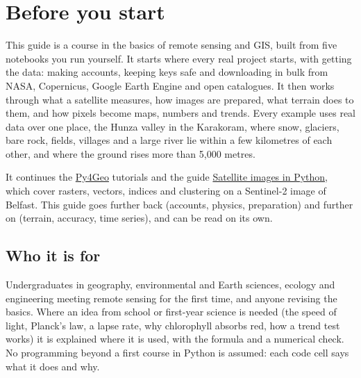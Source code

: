 \chapter{Before you start}\label{ch:start}

This guide is a course in the basics of remote sensing and GIS, built from five notebooks you run yourself. It starts where every real project starts, with getting the data: making accounts, keeping keys safe and downloading in bulk from NASA, Copernicus, Google Earth Engine and open catalogues. It then works through what a satellite measures, how images are prepared, what terrain does to them, and how pixels become maps, numbers and trends. Every example uses real data over one place, the Hunza valley in the Karakoram, where snow, glaciers, bare rock, fields, villages and a large river lie within a few kilometres of each other, and where the ground rises more than 5,000 metres.

It continues the \href{https://github.com/GeospatialGeeks/Py4Geo}{Py4Geo} tutorials and the guide \href{https://ahmadammar.github.io/teaching/satellite-python/}{Satellite images in Python}, which cover rasters, vectors, indices and clustering on a Sentinel-2 image of Belfast. This guide goes further back (accounts, physics, preparation) and further on (terrain, accuracy, time series), and can be read on its own.

\section{Who it is for}
Undergraduates in geography, environmental and Earth sciences, ecology and engineering meeting remote sensing for the first time, and anyone revising the basics. Where an idea from school or first-year science is needed (the speed of light, Planck's law, a lapse rate, why chlorophyll absorbs red, how a trend test works) it is explained where it is used, with the formula and a numerical check. No programming beyond a first course in Python is assumed: each code cell says what it does and why.

